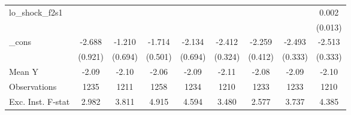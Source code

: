 {\begin{tabular}{l*{8}{c}}
\addlinespace
lo\_shock\_f2s1&                     &                     &                     &                     &                     &                     &                     &       0.002         \\
            &                     &                     &                     &                     &                     &                     &                     &     (0.013)         \\
\addlinespace
\_cons      &      -2.688\sym{***}&      -1.210\sym{*}  &      -1.714\sym{***}&      -2.134\sym{***}&      -2.412\sym{***}&      -2.259\sym{***}&      -2.493\sym{***}&      -2.513\sym{***}\\
            &     (0.921)         &     (0.694)         &     (0.501)         &     (0.694)         &     (0.324)         &     (0.412)         &     (0.333)         &     (0.333)         \\
\midrule
Mean Y      &       -2.09         &       -2.10         &       -2.06         &       -2.09         &       -2.11         &       -2.08         &       -2.09         &       -2.10         \\
Observations&        1235         &        1211         &        1258         &        1234         &        1210         &        1233         &        1233         &        1210         \\
Exc. Inst. F-stat&       2.982         &       3.811         &       4.915         &       4.594         &       3.480         &       2.577         &       3.737         &       4.385         \\
\bottomrule
\end{tabular}
}
